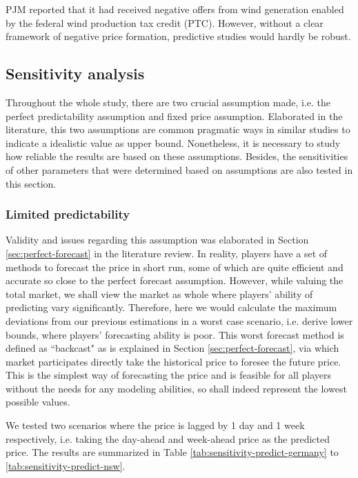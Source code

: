 PJM reported that it had received negative offers from wind generation enabled by the federal wind production tax credit (PTC)\cite{PJM_price_limit_1}. However, without a clear framework of negative price formation, predictive studies would hardly be robust. 

\subsection{Sensitivity analysis}
\label{sec:sensitivity}
Throughout the whole study, there are two crucial assumption made, i.e. the perfect predictability assumption and fixed price assumption. Elaborated in the literature, this two assumptions are common pragmatic ways in similar studies to indicate a idealistic value as upper bound. Nonetheless, it is necessary to study how reliable the results are based on these assumptions. Besides, the sensitivities of other parameters that were determined based on assumptions are also tested in this section.

\subsubsection{Limited predictability}
Validity and issues regarding this assumption was elaborated in Section \ref{sec:perfect-forecast} in the literature review. In reality, players have a set of methods to forecast the price in short run, some of which are quite efficient and accurate \cite{Weron2014} so close to the perfect forecast assumption. However, while valuing the total market, we shall view the market as whole where players' ability of predicting vary significantly. Therefore, here we would calculate the maximum deviations from our previous estimations in a worst case scenario, i.e. derive lower bounds, where players' forecasting ability is poor. This worst forecast method is defined as ``backcast" as is explained in Section \ref{sec:perfect-forecast}, via which market participates directly take the historical price to foresee the future price. This is the simplest way of forecasting the price and is feasible for all players without the needs for any modeling abilities, so shall indeed represent the lowest possible values.

We tested two scenarios where the price is lagged by 1 day and 1 week respectively, i.e. taking the day-ahead and week-ahead price as the predicted price. The results are summarized in Table \ref{tab:sensitivity-predict-germany} to \ref{tab:sensitivity-predict-nsw}.

